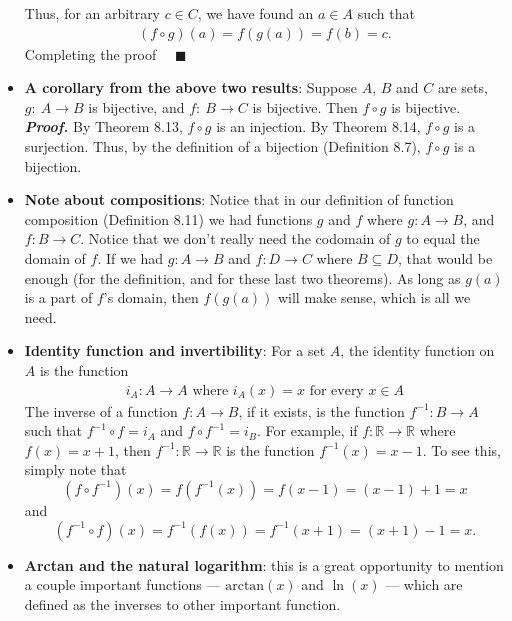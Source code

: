 \documentclass{report}
\begin{document}
\begin{itemize}
            \bigbreak \noindent 
            Thus, for an arbitrary $c\in C$, we have found an $a\in A$ such that
            \begin{align*}
                (f\circ g)(a) = f(g(a)) = f(b) = c
            .\end{align*}
            Completing the proof $\quad \blacksquare $
        \item \textbf{A corollary from the above two results}: Suppose $A$, $B$ and $C$ are sets, $g:\  A \to B$ is bijective, and $f:\ B \to C$ is bijective. Then $f \circ g$ is bijective.
            \bigbreak \noindent 
            \textbf{\textit{Proof.}} By Theorem 8.13, \( f \circ g \) is an injection. By Theorem 8.14, \( f \circ g \) is a surjection. Thus, by the definition of a bijection (Definition 8.7), \( f \circ g \) is a bijection.
        \item \textbf{Note about compositions}: Notice that in our definition of function composition (Definition 8.11) we had functions \( g \) and \( f \) where \( g : A \to B \), and \( f : B \to C \). Notice that we don’t really need the codomain of \( g \) to equal the domain of \( f \). If we had \( g : A \to B \) and \( f : D \to C \) where \( B \subseteq D \), that would be enough (for the definition, and for these last two theorems). As long as \( g(a) \) is a part of \( f \)’s domain, then \( f(g(a)) \) will make sense, which is all we need.
        \item \textbf{Identity function and invertibility}: For a set \( A \), the identity function on \( A \) is the function 
            \begin{align*}
                i_A : A \to A  \text{ where } i_A(x) = x  \text{ for every }  x \in A 
            \end{align*}
            \bigbreak \noindent 
            The inverse of a function \( f : A \to B \), if it exists, is the function \( f^{-1} : B \to A \) such that \( f^{-1} \circ f = i_A \) and \( f \circ f^{-1} = i_B \).
            \bigbreak \noindent 
            For example, if \( f : \mathbb{R} \to \mathbb{R} \) where \( f(x) = x + 1 \), then \( f^{-1} : \mathbb{R} \to \mathbb{R} \) is the function
            \( f^{-1}(x) = x - 1 \). To see this, simply note that
            \[
                (f \circ f^{-1})(x) = f(f^{-1}(x)) = f(x - 1) = (x - 1) + 1 = x
            \]
            and
            \[
                (f^{-1} \circ f)(x) = f^{-1}(f(x)) = f^{-1}(x + 1) = (x + 1) - 1 = x.
            \]
        \item \textbf{Arctan and the natural logarithm}: this is a great opportunity to mention a couple important functions — $\text{arctan}(x)$ and $\ln(x)$ — which are defined as the inverses to other important function.

\end{itemize}
\end{document}
